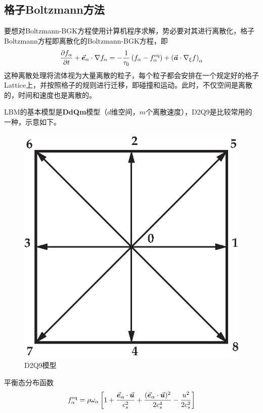 \documentclass[fontset=fandol]{ctexart}
\numberwithin{equation}{section} %
\begin{document}
\subsection{格子Boltzmann方法}
要想对Boltzmann-BGK方程使用计算机程序求解，势必要对其进行离散化，格子Boltzmann方程即离散化的Boltzmann-BGK方程，即
\begin{equation}
    \pdv{f_\alpha}{t}+\va*{e}_\alpha\cdot\nabla f_\alpha=-\frac{1}{\tau_0}\left(f_\alpha-f_\alpha^{\rm eq}\right)+\left(\va*{a}\cdot\nabla_{\xi}f\right)_\alpha
\end{equation}
这种离散处理将流体视为大量离散的粒子，每个粒子都会安排在一个规定好的格子Lattice上，并按照格子的规则进行迁移，即碰撞和运动。此时，不仅空间是离散的，时间和速度也是离散的。

LBM的基本模型是\textbf{DdQm}模型（$d$维空间，$m$个离散速度），D2Q9是比较常用的一种，示意如下。
\begin{figure}[H]
    \centering
    \includegraphics[scale=0.6]{D2Q9.eps}
    \caption{D2Q9模型}
\end{figure}
平衡态分布函数
\begin{equation}
    f_{\alpha}^{\rm eq}=\rho\omega_\alpha\left[1+\frac{\va*{e}_\alpha\cdot \va*{u}}{c_s^2}+\frac{(\va*{e}_\alpha\cdot \va*{u})^2}{2c_s^4}-\frac{u^2}{2c_s^2}\right]
\end{equation}
\end{document}
